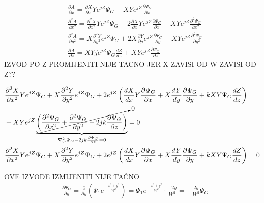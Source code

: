 \documentclass[fleqn]{report}
\begin{document}
\begin{tbox}
    \begin{align*}
         & \frac{\partial A}{\partial x} = \frac{\partial X}{\partial x} Y e^{jZ} \Psi_G + XYe^{jZ}\frac{\partial \Psi_G}{\partial x}                                                                                           \\
         & \frac{\partial^2 A}{\partial x^2} = \frac{\partial^2 X}{\partial x^2} Y e^{jZ} \Psi_G + 2 \frac{\partial X}{\partial x} Y e^{jZ} \frac{\partial \Psi_G}{\partial x} + XYe^{jZ}\frac{\partial^2 \Psi_G}{\partial x^2} \\
         & \frac{\partial^2 A}{\partial y^2} = X\frac{\partial^2 Y}{\partial y^2} e^{jZ} \Psi_G + 2 X \frac{\partial Y}{\partial y} e^{jZ} \frac{\partial \Psi_G}{\partial y} + XYe^{jZ}\frac{\partial^2 \Psi_G}{\partial y^2}  \\
         & \frac{\partial A}{\partial z} = XY je^{jZ} \Psi_G \frac{dZ}{dz} + XY e^{jZ} \frac{\partial \Psi_G}{\partial z}
    \end{align*}
    IZVOD PO Z PROMIJENITI NIJE TACNO JER X ZAVISI OD W ZAVISI OD Z??
\end{tbox}
\begin{align*}
     & \frac{\partial^2 X}{\partial x^2} Y e^{jZ} \Psi_G + X \frac{\partial^2 Y}{\partial y^2} e^{jZ} \Psi_G + 2e^{jZ} \left(\frac{dX}{dx} Y \frac{\partial \Psi_G}{\partial x} + X \frac{dY}{dy}\frac{\partial \Psi_G}{\partial y} + kXY\Psi_G\frac{dZ}{dz}\right)      \\
     & + XYe^{jZ} \underbrace{\cancelto{0}{\left(\frac{\partial^2 \Psi_G}{\partial x^2} + \frac{\partial^2 \Psi_G}{\partial y^2} - 2jk\frac{\partial \Psi_G}{\partial z}\right)}}_{\nabla_T^2\Psi_G - 2jk\frac{\partial\Psi_G}{\partial z} = 0} = 0                      \\
     & \frac{\partial^2 X}{\partial x^2} Y e^{jZ} \Psi_G + X \frac{\partial^2 Y}{\partial y^2} e^{jZ} \Psi_G + 2e^{jZ} \left(\frac{dX}{dx} Y \frac{\partial \Psi_G}{\partial x} + X \frac{dY}{dy}\frac{\partial \Psi_G}{\partial y} + kXY\Psi_G\frac{dZ}{dz}\right)  = 0 \\
\end{align*}
\begin{tbox}
    OVE IZVODE IZMIJENITI NIJE TAČNO
    \begin{align*}
         & \frac{\partial \Psi_G}{\partial y} = \frac{\partial}{\partial y} \left(\Psi_1e^{-\frac{x^2 + y^2}{W^2}} \right) = \Psi_1e^{-\frac{x^2 + y^2}{W^2}}\cdot \frac{-2y}{W^2} = -\frac{2y}{W^2} \Psi_G \\
    \end{align*}
\end{tbox}
\end{document}
